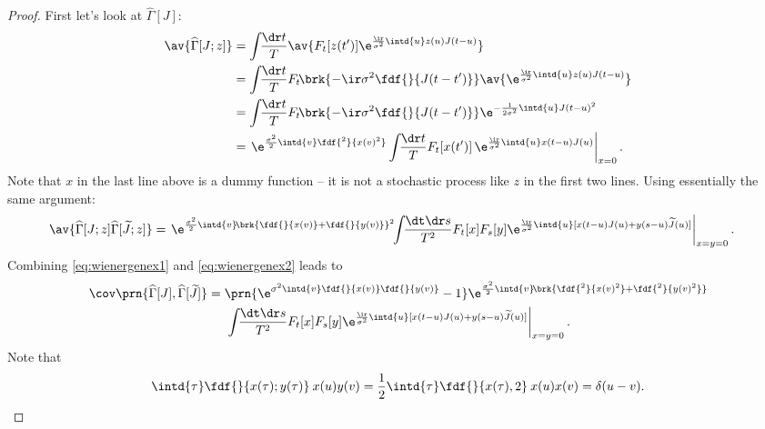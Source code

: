 \documentclass[12pt]{article}
\newcommand{\tj}{\widetilde{J}}
\newcommand{\hz}{\widehat{\Gamma}}
\newcommand{\ds}{\dr s}
\begin{document}
\begin{proof}
  First let's look at $\hz[J]$:
  \begin{equation}\label{eq:wienergenex1}
    \begin{aligned}
      \av{\hz[J;z]}
        &= \int\!\!\frac{\dr t}{T} \av{F_t[z(t')]
                        \e^{\frac{\ir}{\sigma^2}\intd{u}z(u)J(t-u)}}  \\
        &= \int\!\!\frac{\dr t}{T} F_t\!\brk{-\ir\sigma^2\fdf{}{J(t-t')}}
                  \av{\e^{\frac{\ir}{\sigma^2}\intd{u}z(u)J(t-u)}} \\
        &=  \int\!\!\frac{\dr t}{T} F_t\!\brk{-\ir\sigma^2\fdf{}{J(t-t')}}
            \e^{-\frac{1}{2\sigma^2}\intd{u}J(t-u)^2} \\
        &= \left. \e^{\frac{\sigma^2}{2}\intd{v}\fdf{^2}{x(v)^2}}
            \int\!\!\frac{\dr t}{T} F_t[x(t')] \,
            \e^{\frac{\ir}{\sigma^2}\intd{u}x(t-u)J(u)} \right|_{x=0}.
    \end{aligned}
  \end{equation}
  Note that \(x\) in the last line above is a dummy function -- it is not a stochastic process like \(z\) in the first two lines.
  Using essentially the same argument:
  \begin{equation}\label{eq:wienergenex2}
    \begin{aligned}
      \av{\hz[J;z]\hz[\tj;z]}
        &= \left. \e^{\frac{\sigma^2}{2}\intd{v}\!\brk{\fdf{}{x(v)}+\fdf{}{y(v)}}^2}
            \!\!\int\!\!\frac{\dt \ds}{T^2} F_t[x] F_s[y]
            \e^{\frac{\ir}{\sigma^2}\intd{u}[x(t-u)J(u)+y(s-u)\tj(u)]} \right|_{x=y=0}.
    \end{aligned}
  \end{equation}
  Combining \eqref{eq:wienergenex1} and \eqref{eq:wienergenex2} leads to
  \begin{multline}\label{eq:wienergencov}
    \cov\prn{\hz[J],\hz[\tj]}
      = \prn{\e^{\sigma^2\intd{v}\fdf{}{x(v)}\fdf{}{y(v)}}-1}
          \e^{\frac{\sigma^2}{2} \intd{v}\!\brk{\fdf{^2}{x(v)^2}+\fdf{^2}{y(v)^2}}} \\
      \left. \int\!\!\frac{\dt \ds}{T^2} F_t[x] F_s[y]
          \e^{\frac{\ir}{\sigma^2}\intd{u}[x(t-u)J(u)+y(s-u)\tj(u)]} \right|_{x=y=0}.
  \end{multline}
  Note that
  \begin{equation*}
    \intd{\tau}\fdf{}{x(\tau);y(\tau)}\: x(u) y(v)
      = \frac{1}{2} \intd{\tau}\fdf{}{x(\tau),2}\: x(u)x(v)
      = \delta(u-v).
  \end{equation*}

\end{proof}
\end{document}
